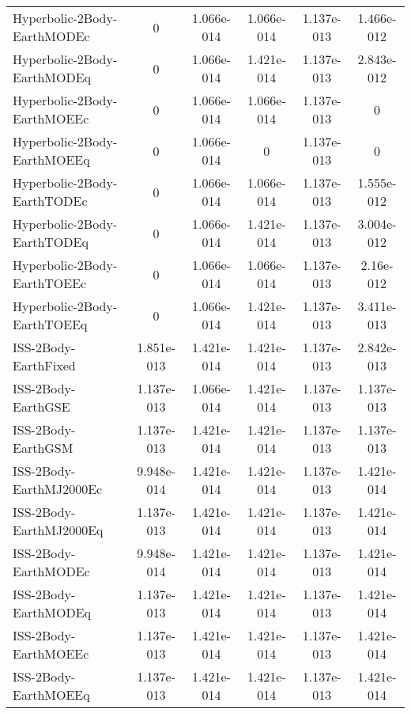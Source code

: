 \begin{table}[htbp!]
\begin{tabular}{lccccc}
         Hyperbolic-2Body-EarthMODEc & 0 & 1.066e-014 & 1.066e-014 & 1.137e-013 & 1.466e-012 \\
         Hyperbolic-2Body-EarthMODEq & 0 & 1.066e-014 & 1.421e-014 & 1.137e-013 & 2.843e-012 \\
         Hyperbolic-2Body-EarthMOEEc & 0 & 1.066e-014 & 1.066e-014 & 1.137e-013 & 0 \\
         Hyperbolic-2Body-EarthMOEEq & 0 & 1.066e-014 & 0 & 1.137e-013 & 0 \\
         Hyperbolic-2Body-EarthTODEc & 0 & 1.066e-014 & 1.066e-014 & 1.137e-013 & 1.555e-012 \\
         Hyperbolic-2Body-EarthTODEq & 0 & 1.066e-014 & 1.421e-014 & 1.137e-013 & 3.004e-012 \\
         Hyperbolic-2Body-EarthTOEEc & 0 & 1.066e-014 & 1.066e-014 & 1.137e-013 & 2.16e-012 \\
         Hyperbolic-2Body-EarthTOEEq & 0 & 1.066e-014 & 1.421e-014 & 1.137e-013 & 3.411e-013 \\
         ISS-2Body-EarthFixed & 1.851e-013 & 1.421e-014 & 1.421e-014 & 1.137e-013 & 2.842e-013 \\
         ISS-2Body-EarthGSE & 1.137e-013 & 1.066e-014 & 1.421e-014 & 1.137e-013 & 1.137e-013 \\
         ISS-2Body-EarthGSM & 1.137e-013 & 1.421e-014 & 1.421e-014 & 1.137e-013 & 1.137e-013 \\
         ISS-2Body-EarthMJ2000Ec & 9.948e-014 & 1.421e-014 & 1.421e-014 & 1.137e-013 & 1.421e-014 \\
         ISS-2Body-EarthMJ2000Eq & 1.137e-013 & 1.421e-014 & 1.421e-014 & 1.137e-013 & 1.421e-014 \\
         ISS-2Body-EarthMODEc & 9.948e-014 & 1.421e-014 & 1.421e-014 & 1.137e-013 & 1.421e-014 \\
         ISS-2Body-EarthMODEq & 1.137e-013 & 1.421e-014 & 1.421e-014 & 1.137e-013 & 1.421e-014 \\
         ISS-2Body-EarthMOEEc & 1.137e-013 & 1.421e-014 & 1.421e-014 & 1.137e-013 & 1.421e-014 \\
         ISS-2Body-EarthMOEEq & 1.137e-013 & 1.421e-014 & 1.421e-014 & 1.137e-013 & 1.421e-014 \\

\end{tabular}
\end{table}
